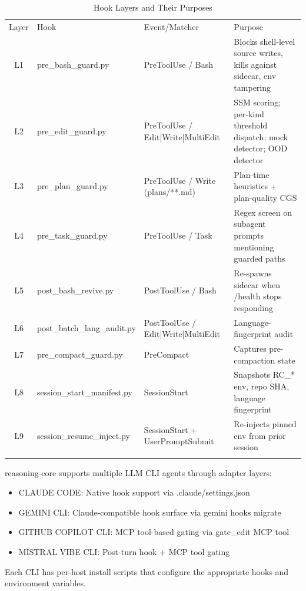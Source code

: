 \begin{table}[t]
    \centering
    \caption{Hook Layers and Their Purposes}
    \label{tab:hook_layers}
    \begin{tabular}{cllp{7cm}}
        \toprule
        Layer & Hook & Event/Matcher & Purpose \\\n        \midrule
        L1 & pre_bash_guard.py & PreToolUse / Bash & Blocks shell-level source writes, kills against sidecar, env tampering \\\n        L2 & pre_edit_guard.py & PreToolUse / Edit|Write|MultiEdit & SSM scoring; per-kind threshold dispatch; mock detector; OOD detector \\\n        L3 & pre_plan_guard.py & PreToolUse / Write (plans/**.md) & Plan-time heuristics + plan-quality CGS \\\n        L4 & pre_task_guard.py & PreToolUse / Task & Regex screen on subagent prompts mentioning guarded paths \\\n        L5 & post_bash_revive.py & PostToolUse / Bash & Re-spawns sidecar when /health stops responding \\\n        L6 & post_batch_lang_audit.py & PostToolUse / Edit|Write|MultiEdit & Language-fingerprint audit \\\n        L7 & pre_compact_guard.py & PreCompact & Captures pre-compaction state \\\n        L8 & session_start_manifest.py & SessionStart & Snapshots RC_* env, repo SHA, language fingerprint \\\n        L9 & session_resume_inject.py & SessionStart + UserPromptSubmit & Re-injects pinned env from prior session \\\n        \bottomrule
    \end{tabular}
\end{table}


reasoning-core supports multiple LLM CLI agents through adapter layers:

\begin{itemize}
    \item CLAUDE CODE: Native hook support via .claude/settings.json
    \item GEMINI CLI: Claude-compatible hook surface via gemini hooks migrate
    \item GITHUB COPILOT CLI: MCP tool-based gating via gate_edit MCP tool
    \item MISTRAL VIBE CLI: Post-turn hook + MCP tool gating
\end{itemize}

Each CLI has per-host install scripts that configure the appropriate hooks and environment variables.

